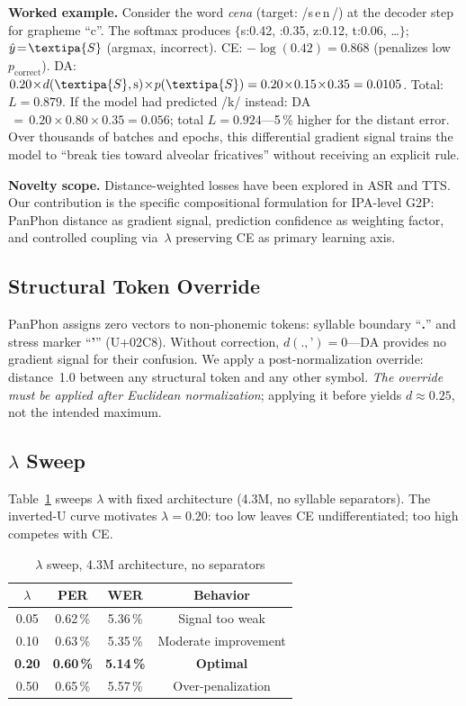 \documentclass[conference]{IEEEtran}
\newcommand{\lam}{\lambda}                %
\begin{document}
\textbf{Worked example.}
Consider the word \textit{cena} (target: /s\,e\,n\,/)
at the decoder step for grapheme ``c''.
The softmax produces
$\{$s:0.42, :0.35, z:0.12, t:0.06, \ldots$\}$;
$\hat{y}\!=\!\textipa{S}$ (argmax, incorrect).
CE: $-\!\log(0.42)\!=\!0.868$ (penalizes low $p_\mathrm{correct}$).
DA: $0.20\!\times\!d(\textipa{S},\mathrm{s})\!\times\!p(\textipa{S})
     = 0.20\!\times\!0.15\!\times\!0.35 = 0.0105$.
Total: $L\!=\!0.879$.
If the model had predicted /k/ instead:
DA$\,=\,0.20\!\times\!0.80\!\times\!0.35 = 0.056$;
total $L\!=\!0.924$---5\,\% higher for the distant error.
Over thousands of batches and epochs, this differential gradient
signal trains the model to ``break ties toward alveolar fricatives''
without receiving an explicit rule.

\textbf{Novelty scope.}
Distance-weighted losses have been explored in ASR and TTS.
Our contribution is the specific compositional formulation for
IPA-level G2P: PanPhon distance as gradient signal, prediction
confidence as weighting factor, and controlled coupling via~$\lam$
preserving CE as primary learning axis.

\subsection{Structural Token Override}

PanPhon assigns zero vectors to non-phonemic tokens: syllable
boundary ``\textbf{.}'' and stress marker ``\textbf{'}'' (U+02C8).
Without correction, $d(., \text{'}) = 0$---DA provides no gradient
signal for their confusion.
We apply a post-normalization override: distance~1.0 between any
structural token and any other symbol.
\emph{The override must be applied after Euclidean normalization};
applying it before yields $d\!\approx\!0.25$, not the intended
maximum.

\subsection{$\lambda$ Sweep}

Table~\ref{tab:lambda} sweeps $\lam$ with fixed architecture (4.3M,
no syllable separators).
The inverted-U curve motivates $\lam\!=\!0.20$: too low leaves CE
undifferentiated; too high competes with CE.

\begin{table}[t]
  \caption{$\lambda$ sweep, 4.3M architecture, no separators}
  \label{tab:lambda}
  \centering\small
  \begin{tabular}{cccc}
    \toprule
    $\lambda$ & PER & WER & Behavior \\
    \midrule
    0.05 & 0.62\,\% & 5.36\,\% & Signal too weak \\
    0.10 & 0.63\,\% & 5.35\,\% & Moderate improvement \\
    \textbf{0.20} & \textbf{0.60\,\%} & \textbf{5.14\,\%} & \textbf{Optimal} \\
    0.50 & 0.65\,\% & 5.57\,\% & Over-penalization \\
    \bottomrule
  \end{tabular}
\end{table}
\end{document}
